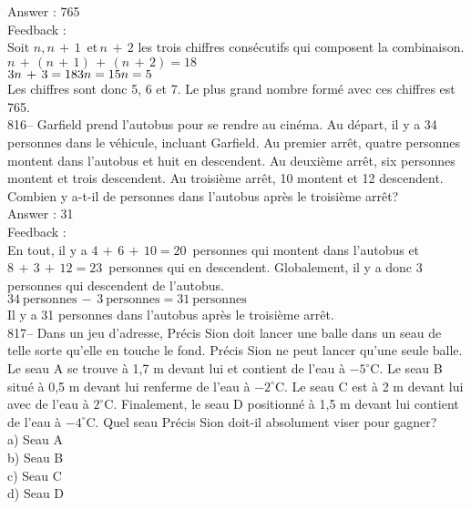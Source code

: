 \documentclass[letterpaper, 12pt]{article}
\begin{document}
Answer : 765\\

Feedback : \\
Soit $n, n\,+\,1\,$ et$\, n\,+\,2$ les trois chiffres cons\'ecutifs qui
composent la combinaison.  \\
$n\,+\,\left( n\,+\,1\right) \,+\,\left( n\,+\,2\right) = 18$\\
$3n\,+\,3=18\\
3n=15\\
n=5$\\
Les chiffres sont donc 5, 6 et 7.  Le plus grand nombre form\'e avec ces
chiffres est 765.\\


816-- Garfield prend l'autobus pour se rendre au cin\'ema.  Au d\'epart, il
y a 34 personnes dans le v\'ehicule, incluant Garfield.  Au premier arr\^et,
quatre personnes montent dans l'autobus et huit en descendent.  Au
deuxi\`eme arr\^et, six personnes montent et trois descendent.  Au
troisi\`eme arr\^et, 10 montent et 12 descendent.  Combien y a-t-il de
personnes dans l'autobus apr\`es le troisi\`eme arr\^et?\\

Answer : 31\\

Feedback : \\
En tout, il y a $4\,+\,6\,+\,10=20$~personnes qui montent dans l'autobus et
$8\,+\,3\,+\,12=23$~personnes qui en descendent.  Globalement, il y a donc 3
personnes qui descendent de l'autobus.  \\
$34~\textrm{personnes}\,-\,3~\textrm{personnes}=31~\textrm{personnes}$ \\
Il y a 31 personnes dans l'autobus apr\`es le troisi\`eme arr\^et.\\

817-- Dans un jeu d'adresse, Pr\'ecis Sion doit lancer une balle dans un
seau de telle sorte qu'elle en touche le fond.  Pr\'ecis Sion ne peut lancer
qu'une seule balle.  Le seau A se trouve \`a 1,7 m devant lui et contient de
l'eau \`a $-5^{\circ}$C.  Le seau B situ\'e \`a 0,5 m devant lui renferme de
l'eau \`a $-2^{\circ}$C.  Le seau C est \`a 2 m devant lui avec de l'eau \`a
$2^{\circ}$C.  Finalement, le seau D positionn\'e \`a 1,5 m devant lui
contient de l'eau \`a $-4^{\circ}$C.  Quel seau Pr\'ecis Sion doit-il
absolument viser pour gagner?\\
a) Seau A\\
b) Seau B\\
c) Seau C\\
d) Seau D\\
\end{document}

